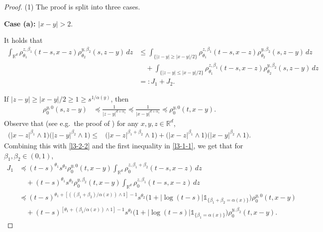 \documentclass[a4paper,11pt]{amsart}
\renewcommand{\le}{\leqslant}
\renewcommand{\ge}{\geqslant}
\newcommand{\R}{\mathds R}
\newcommand{\B}{\beta}
\newcommand{\T}{\theta}
\newcommand{\I}{\mathds 1}
\newcommand{\p}{\preceq}
\newcommand{\A}{\alpha}
\theoremstyle{definition}
\begin{document}
\begin{proof} (1) The proof is split into three cases.


{\bf Case (a): $|x-y|>2.$}

It holds that
\begin{equation}\label{l3-2-1a}
\begin{split}
 \int_{\R^d} \rho_{\T_1}^{z,\beta_1}(t-s,x-z)\rho_{\T_2}^{y,\beta_2}(s,z-y)\,dz
&\le  \int_{\{|z-y|\ge {|x-y|}/{2}\}} \rho_{\T_1}^{z,\beta_1}(t-s,x-z)\rho_{\T_2}^{y,\beta_2}(s,z-y)\,dz\\
 &\quad+\int_{\{|z-y|\le {|x-y|}/{2}\}} \rho_{\T_1}^{z,\beta_1}(t-s,x-z)\rho_{\T_2}^{y,\beta_2}(s,z-y)\, dz\\
&=:J_1+J_2.
\end{split}
\end{equation}

If $|z-y|\ge {|x-y|}/{2}\ge 1\ge s^{{1/\A(y)}}$, then
\begin{equation}\label{l3-2-2}
\begin{split}
\rho_0^{y,0}(s,z-y)&\p \frac{1}{|z-y|^{d+\A_1}}\p
\frac{1}{|x-y|^{d+\A_1}}\p \rho_0^{y,0}(t,x-y).
\end{split}
\end{equation}
Observe that
(see e.g.\ the proof of \cite[Lemma 2.2]{CZ}) for any $x,y, z\in
\R^d$,
\begin{equation}\label{l3-2-3}
\begin{split}
\big(|x-z|^{\B_1}\wedge 1\big)
\big(|z-y|^{\B_2}\wedge 1\big)\le &\big(|x-z|^{\B_1+\B_2}\wedge 1\big) +\big(|x-z|^{\B_1}\wedge 1\big)
\big(|x-y|^{\B_2}\wedge 1\big).
\end{split}
\end{equation}
Combining this with \eqref{l3-2-2} and the first inequality in \eqref{l3-1-1},
we get that for $\beta_1,\beta_2\in (0,1)$,
 \begin{equation}\label{l3-2-4}
\begin{split}
J_1&\p (t-s)^{\T_1}s^{\T_2}\rho_0^{y,0}(t,x-y)\int_{\R^d}\rho^{z,\B_1+\B_2}_0(t-s,x-z)\,dz\\
&\quad +(t-s)^{\T_1}s^{\T_2}\rho_0^{y,\B_2}(t,x-y)\int_{\R^d}\rho^{z,\B_1}_0(t-s,x-z)\,dz\\
&\p (t-s)^{\T_1+[(({\B_1+\B_2})/{\A(x)
})\wedge 1]-1}s^{\T_2}\big(1\!+\!|\log (t-s)|\I_{\{\B_1+\B_2=\A(x)\}}\big)\rho_0^{y,0}(t,x-y)\\
&\quad+
(t-s)^{[\T_1+({\B_1}/{\A(x)})\wedge 1]-1}s^{\T_2}\big(1+|\log (t-s)|\I_{\{\B_1=\A(x)\}}\big)\rho_0^{y,\B_2}(t,x-y).
\end{split}
\end{equation}



\end{proof}
\end{document}
